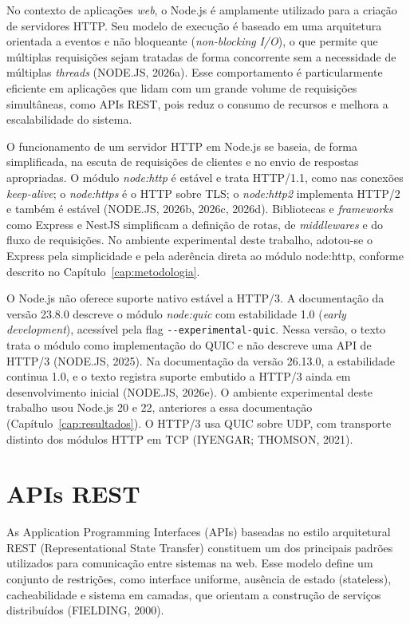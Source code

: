 No contexto de aplicações \textit{web}, o Node.js é amplamente utilizado para a criação de servidores HTTP. Seu modelo de execução é baseado em uma arquitetura orientada a eventos e não bloqueante (\textit{non-}\textit{blocking}\textit{ I/O}), o que permite que múltiplas requisições sejam tratadas de forma concorrente sem a necessidade de múltiplas \textit{threads} (NODE.JS, 2026a). Esse comportamento é particularmente eficiente em aplicações que lidam com um grande volume de requisições simultâneas, como APIs REST, pois reduz o consumo de recursos e melhora a escalabilidade do sistema.

O funcionamento de um servidor HTTP em Node.js se baseia, de forma simplificada, na escuta de requisições de clientes e no envio de respostas apropriadas. O módulo \textit{node:http} é estável e trata HTTP/1.1, como nas conexões \textit{keep-alive}; o \textit{node:https} é o HTTP sobre TLS; o \textit{node:http2} implementa HTTP/2 e também é estável (NODE.JS, 2026b, 2026c, 2026d). Bibliotecas e \textit{frameworks} como Express e NestJS simplificam a definição de rotas, de \textit{middlewares} e do fluxo de requisições. No ambiente experimental deste trabalho, adotou-se o Express pela simplicidade e pela aderência direta ao módulo node:http, conforme descrito no Capítulo~\ref{cap:metodologia}.

O Node.js não oferece suporte nativo estável a HTTP/3. A documentação da versão 23.8.0 descreve o módulo \textit{node:quic} com estabilidade 1.0 (\textit{early development}), acessível pela flag \texttt{-{}-experimental-quic}. Nessa versão, o texto trata o módulo como implementação do QUIC e não descreve uma API de HTTP/3 (NODE.JS, 2025). Na documentação da versão 26.13.0, a estabilidade continua 1.0, e o texto registra suporte embutido a HTTP/3 ainda em desenvolvimento inicial (NODE.JS, 2026e). O ambiente experimental deste trabalho usou Node.js 20 e 22, anteriores a essa documentação (Capítulo~\ref{cap:resultados}). O HTTP/3 usa QUIC sobre UDP, com transporte distinto dos módulos HTTP em TCP (IYENGAR; THOMSON, 2021).

\section{APIs REST}\label{sec:apis-rest}

As Application Programming Interfaces (APIs) baseadas no estilo arquitetural REST (Representational State Transfer) constituem um dos principais padrões utilizados para comunicação entre sistemas na web. Esse modelo define um conjunto de restrições, como interface uniforme, ausência de estado (stateless), cacheabilidade e sistema em camadas, que orientam a construção de serviços distribuídos (FIELDING, 2000).

